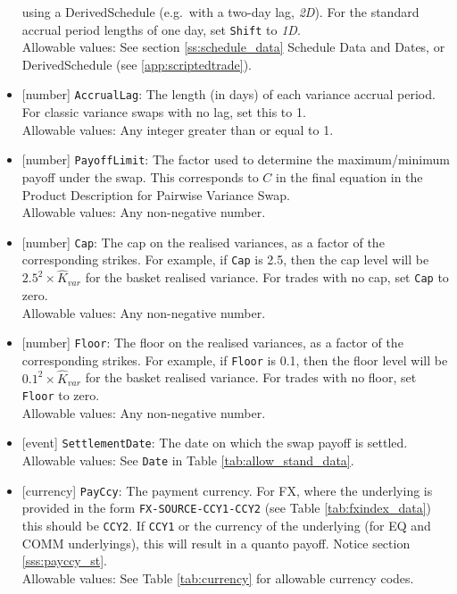 \begin{itemize}
  using a DerivedSchedule (e.g.\ with a two-day lag, \emph{2D}). For the standard accrual period lengths of one day,
  set \lstinline!Shift! to \emph{1D}. \\
  Allowable values: See section \ref{ss:schedule_data} Schedule Data and Dates, or DerivedSchedule (see \ref{app:scriptedtrade}).
  \item{}[number] \lstinline!AccrualLag!: The length (in days) of each variance accrual period. For classic variance swaps with no lag, set this to 1. \\
  Allowable values: Any integer greater than or equal to 1.
  \item{}[number] \lstinline!PayoffLimit!: The factor used to determine the maximum/minimum payoff under the swap. This corresponds to $C$
  in the final equation in the Product Description for Pairwise Variance Swap. \\
  Allowable values: Any non-negative number.
  \item{}[number] \lstinline!Cap!: The cap on the realised variances, as a factor of the corresponding strikes. For example,
  if \lstinline!Cap! is 2.5, then the cap level will be $2.5^2 \times \hat{K}_{var}$ for the basket realised variance.
  For trades with no cap, set \lstinline!Cap! to zero. \\
  Allowable values: Any non-negative number.
  \item{}[number] \lstinline!Floor!: The floor on the realised variances, as a factor of the corresponding strikes. For example,
  if \lstinline!Floor! is 0.1, then the floor level will be $0.1^2 \times \hat{K}_{var}$ for the basket realised variance.
  For trades with no floor, set \lstinline!Floor! to zero. \\
  Allowable values: Any non-negative number.
  \item{}[event] \lstinline!SettlementDate!: The date on which the swap payoff is settled. \\
  Allowable values: See \lstinline!Date! in Table \ref{tab:allow_stand_data}.
  \item{}[currency] \lstinline!PayCcy!: The payment currency. For FX, where the underlying is provided
      in the form \lstinline!FX-SOURCE-CCY1-CCY2! (see Table \ref{tab:fxindex_data}) this should
      be \lstinline!CCY2!. If \lstinline!CCY1! or the currency of the underlying (for EQ and
      COMM underlyings), this will result in a quanto payoff. Notice section \ref{sss:payccy_st}. \\
        Allowable values: See Table \ref{tab:currency} for allowable currency codes.
\end{itemize}

